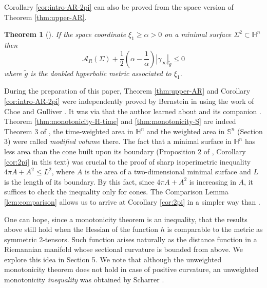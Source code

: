 \documentclass[11pt]{article}
\newtheorem{theorem}{Theorem}
\begin{document}
Corollary \ref{cor:intro-AR-2pi} can also be proved from the space version of
Theorem \ref{thm:upper-AR}.
\begin{theorem}[]
\label{thm:intro-AR-space}
If the space coordinate \(\xi_1 \geq \alpha >0\) on a minimal surface \(\Sigma^2\subset
\mathbb{H}^n\) then
   \[ 
   \mathcal{A}_R(\Sigma) + \frac{1}{2}\left(\alpha - \frac{1}{\alpha}\right)|\gamma_\infty|_{\tilde g} \leq 0  
   \]
where \(\tilde g\) is the doubled hyperbolic metric associated to \(\xi_1\).
\end{theorem}

During the preparation of this paper, Theorem \ref{thm:upper-AR} and Corollary \ref{cor:intro-AR-2pi} were independently proved by Bernstein 
in \cite{Bernstein21_SharpIsoperimetricProperty} using the work of Choe and Gulliver
\cite{Choe.Gulliver92_SharpIsoperimetricInequality}. It was via
\cite{Bernstein21_SharpIsoperimetricProperty} that the author learned about
\cite{Choe.Gulliver92_SharpIsoperimetricInequality} and its companion
\cite{Choe.Gulliver92_IsoperimetricInequalitiesMinimal}. Theorem \ref{thm:monotonicity-H-time} and
\ref{thm:monotonicity-S} are indeed Theorem 3 of \cite{Choe.Gulliver92_IsoperimetricInequalitiesMinimal}, the time-weighted area in \(\mathbb{H}^n\) and the weighted area in \(\mathbb{S}^n\) (Section 3) were called
\emph{modified volume} there. The fact that a minimal surface in \(\mathbb{H}^n\) has less
area than the cone built upon its boundary (Proposition 2 of
\cite{Choe.Gulliver92_SharpIsoperimetricInequality}, Corollary \ref{cor:2pi} in this text) was crucial to the proof of sharp
isoperimetric inequality \(4\pi A + A^2 \leq L^2\), where \(A\) is the area of a two-dimensional minimal surface
and \(L\) is the length of its boundary. By this fact, since
\(4\pi A + A^2\) is increasing in \(A\), it suffices to check the inequality only for
cones. The Comparison Lemma \ref{lem:comparison} allows us to arrive at Corollary \ref{cor:2pi} in a 
simpler way than \cite{Choe.Gulliver92_SharpIsoperimetricInequality}.


One can hope, since a monotonicity theorem is an inequality, that the results above still
 hold when the Hessian of the function \(h\) is comparable to the metric as symmetric
 2-tensors. Such function arises naturally as the distance function in a Riemannian
 manifold whose sectional curvature is bounded from above. We explore this
 idea in Section 5. We note that although the unweighted monotonicity theorem does
 not hold in case of positive curvature, an unweighted monotonicity \emph{inequality} was obtained
 by Scharrer \cite{Scharrer21_GeometricInequalitiesVarifolds}.
\end{document}
